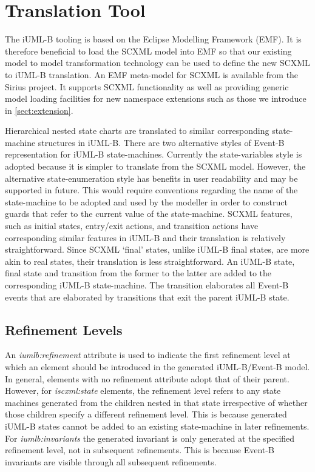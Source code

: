 
\section{Translation Tool}

The iUML-B tooling is based on the Eclipse Modelling Framework (EMF). 
It is therefore beneficial to load the SCXML model into EMF so that 
our existing model to model transformation technology can be used to 
define the new SCXML to iUML-B translation. An EMF meta-model for SCXML 
is available from the Sirius \cite{??}
project. It supports SCXML functionality as well as providing generic model
loading facilities for new namespace extensions such as those we 
introduce in \ref{sect:extension}.

Hierarchical nested state charts are translated to similar corresponding 
state-machine structures in iUML-B. There are two alternative styles of 
Event-B representation for iUML-B state-machines.  Currently the state-variables 
style is adopted because it is simpler to translate from the SCXML model. 
However, the alternative state-enumeration style has benefits in user readability 
and may be supported in future. This would  require conventions regarding 
the name of the state-machine  to be adopted and used by the modeller in order 
to construct guards that refer to the current value of the state-machine.
SCXML features, such as initial states, entry/exit actions, and transition 
actions have corresponding similar features in iUML-B and their translation 
is relatively straightforward. Since SCXML `final' states, unlike iUML-B 
final states, are more akin to real states, their translation is less straightforward. 
An iUML-B state, final state and transition from the former to the latter are 
added to the corresponding iUML-B state-machine. The transition elaborates 
all Event-B events that are elaborated by transitions that exit the parent 
iUML-B state. 

\subsection{Refinement Levels}
An \emph{iumlb:refinement} attribute is used to indicate the first refinement 
level at which an element should be introduced in the generated iUML-B/Event-B model. 
In general, elements with no refinement attribute adopt that of their parent.  
However, for \emph{iscxml:state} elements, the refinement level refers to any state 
machines generated from the children nested in that state irrespective of whether 
those children specify a different refinement level. This is because generated 
iUML-B states cannot be added to an existing state-machine in later refinements.
For \emph{iumlb:invariants} the generated invariant is only  generated at the 
specified refinement level, not in  subsequent refinements. This is because Event-B 
invariants are visible through all subsequent refinements.


